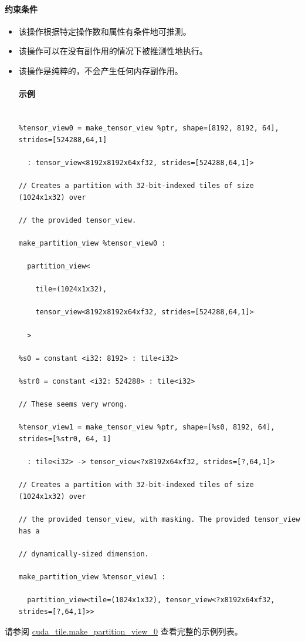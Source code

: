 \documentclass{article}
\begin{document}
\paragraph{约束条件}


\begin{itemize}
\item 该操作根据特定操作数和属性有条件地可推测。
\item 该操作可以在没有副作用的情况下被推测性地执行。
\item 该操作是纯粹的，不会产生任何内存副作用。




\paragraph{示例}


\begin{lstlisting}

%tensor_view0 = make_tensor_view %ptr, shape=[8192, 8192, 64], strides=[524288,64,1]

  : tensor_view<8192x8192x64xf32, strides=[524288,64,1]>

// Creates a partition with 32-bit-indexed tiles of size (1024x1x32) over

// the provided tensor_view.

make_partition_view %tensor_view0 :

  partition_view<

    tile=(1024x1x32),

    tensor_view<8192x8192x64xf32, strides=[524288,64,1]>

  >

%s0 = constant <i32: 8192> : tile<i32>

%str0 = constant <i32: 524288> : tile<i32>

// These seems very wrong.

%tensor_view1 = make_tensor_view %ptr, shape=[%s0, 8192, 64], strides=[%str0, 64, 1]

  : tile<i32> -> tensor_view<?x8192x64xf32, strides=[?,64,1]>

// Creates a partition with 32-bit-indexed tiles of size (1024x1x32) over

// the provided tensor_view, with masking. The provided tensor_view has a

// dynamically-sized dimension.

make_partition_view %tensor_view1 :

  partition_view<tile=(1024x1x32), tensor_view<?x8192x64xf32, strides=[?,64,1]>>

\end{lstlisting}



\end{itemize}
请参阅 \href{https://docs.nvidia.com/cuda/tile-ir/latest/sections/appendix.html#example-cuda-tile-make-partition-view-0}{cuda\_tile.make\_partition\_view\_0} 查看完整的示例列表。
\end{document}
